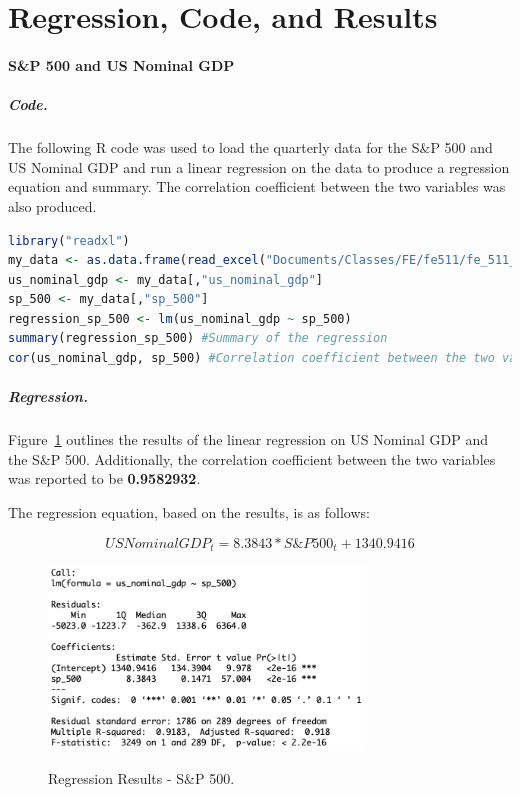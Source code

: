 \documentclass[11pt]{article}
\numberwithin{equation}{section}
\begin{document}
\section{Regression, Code, and Results}

\paragraph{S\&P 500 and US Nominal GDP}

\subparagraph{Code.}
The following R code was used to load the quarterly data for the S\&P 500 and US Nominal GDP and run a linear regression on the data to produce a regression equation and summary. The correlation coefficient between the two variables was also produced.

\vspace{3mm}
\begin{lstlisting}[language=R]
library("readxl")
my_data <- as.data.frame(read_excel("Documents/Classes/FE/fe511/fe_511_final_project/fe_511_data.xlsx"))
us_nominal_gdp <- my_data[,"us_nominal_gdp"]
sp_500 <- my_data[,"sp_500"]
regression_sp_500 <- lm(us_nominal_gdp ~ sp_500)
summary(regression_sp_500) #Summary of the regression
cor(us_nominal_gdp, sp_500) #Correlation coefficient between the two variables

\end{lstlisting}
\vspace{3mm}

\subparagraph{Regression.}
Figure~\ref{fig:model1} outlines the results of the linear regression on US Nominal GDP and the S\&P 500. Additionally, the correlation coefficient between the two variables was reported to be \textbf{0.9582932}.

The regression equation, based on the results, is as follows:

\[ US Nominal GDP_{t} = 8.3843*S\&P500_{t} + 1340.9416 \]

\begin{figure}
	\begin{center}
		{\includegraphics[width=0.75\textwidth]{regression_results_sp500.png}}
	\end{center}
	\caption{Regression Results - S\&P 500.}
	\label{fig:model1}
\end{figure}
\end{document}
